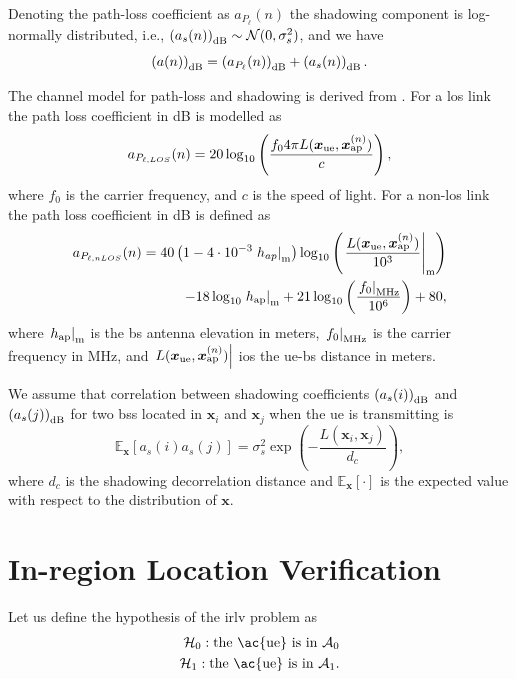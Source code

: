 \documentclass[conference,final]{IEEEtran}
\newcommand{\E}[2]{\mathbb{E}_{#1}\left[#2\right]}
\begin{document}
Denoting the path-loss coefficient as $a_{P_{\ell}}{(n)}$  the shadowing component is log-normally distributed, i.e., $\left(a_{s}{(n)}\right)_{\rm dB} \sim \mathcal{N}(0,\sigma_s^2)$, and we have
\begin{equation}
    \left(a{(n)}\right)_{\rm dB} = \left(a_{P_{\ell}}{(n)}\right)_{\rm dB} + \left(a_s{(n)}\right)_{\rm dB}.
\end{equation}

The channel model for path-loss and shadowing is derived from \cite{3gpp}. For a \ac{los} link the path loss coefficient in dB is modelled as
\begin{equation}\label{eq:los}
    a_{P_{\ell,LOS}}{(n)} = 20\log_{10}\left(\frac{f_0 4\pi L(\bm{x}_{\rm ue},\bm{x}_{\rm ap}^{(n)})}{c}\right),
\end{equation}
where $f_0$ is the carrier frequency, and $c$ is the speed of light. For a  non-\ac{los} link the path loss coefficient in dB is defined as
\begin{equation}
\begin{split}
    a_{P_{\ell, nLOS}}{(n)} = 40\left(1-4 \cdot 10^{-3} \left. h_{ap} \right|_{\rm m} \right) \log_{10}\left (\left.\frac{L(\bm{x}_{\rm ue},\bm{x}_{\rm ap}^{(n)})}{10^3}\right|_{\rm m}\right ) \\
    -18\log_{10}\left.h_{\rm ap}\right|_{\rm m}
    + 21\log_{10}\left(\frac{\left.f_0\right|_{\rm MHz}}{10^6}\right) + 80,
    \end{split}
\end{equation}
where $\left.h_{\rm ap}\right|_{\rm m}$ is the \ac{bs} antenna elevation in meters, $\left. f_0 \right|_{\rm MHz}$ is the carrier frequency in MHz, and $\left. L(\bm{x}_{\rm ue},\bm{x}_{\rm ap}^{(n)})\right|$ ios the \ac{ue}-\ac{bs} distance in meters.

We assume that correlation between shadowing coefficients $\left( a_{s}(i)\right)_{\rm dB}$ and $\left( a_{s}(j)\right)_{\rm dB}$ for two \acp{bs} located in $\bm{x}_i$ and $\bm{x}_j$ when the \ac{ue} is transmitting is
\begin{equation}\label{eq: coor mat}
    \E{\bm x}{a_{s}(i)a_{s}(j)} = \sigma_s^2\exp \left({-\frac{L(\bm{x}_i,\bm{x}_j)}{d_c}}\right),
\end{equation}
where $d_c$ is the shadowing decorrelation distance and $\E{\bm x}{\cdot}$ is the expected value with respect to the distribution of $\bm x$.


\section{In-region Location Verification}\label{sec: ml}
Let us define the hypothesis of the \ac{irlv} problem as
 \begin{equation}
\begin{split}
  \mathcal H_0: \mbox{the \ac{ue} is in $\mathcal{A}_0$} \\
  \mathcal H_1: \mbox{the \ac{ue} is in $\mathcal{A}_1$}. 
  \end{split}
\end{equation}
\end{document}
